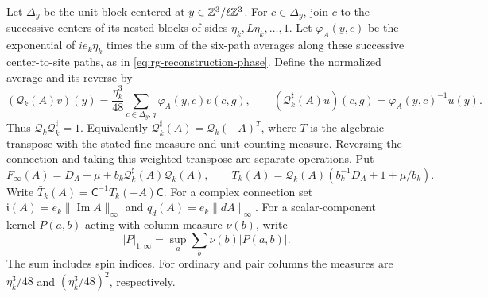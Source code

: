 Let \(\Delta_y\) be the unit block centered at
\(y\in\mathbb Z^3/\ell\mathbb Z^3\). For \(c\in\Delta_y\), join \(c\) to the
successive centers of its nested blocks of sides
\(\eta_k,L\eta_k,\ldots,1\). Let \(\varphi_A(y,c)\) be the
exponential of \(ie_k\eta_k\) times the sum of the six-path
averages along these successive center-to-site paths, as in
\eqref{eq:rg-reconstruction-phase}. Define the normalized average
and its reverse by
\begin{equation}\label{eq:reconstruction-average}
 (\mathcal Q_k(A)v)(y)
      =\frac{\eta_k^3}{48}\sum_{c\in\Delta_y,g}
                                     \varphi_A(y,c)v(c,g),\qquad
 (\mathcal Q_k^\sharp(A)u)(c,g)=\varphi_A(y,c)^{-1}u(y).
\end{equation}
Thus \(\mathcal Q_k\mathcal Q_k^\sharp=1\).
Equivalently \(\mathcal Q_k^\sharp(A)=\mathcal Q_k(-A)^T\),
where \(T\) is the algebraic transpose with the stated fine
measure and unit counting measure. Reversing the connection and
taking this weighted transpose are separate operations.
Put
\[
 F_\infty(A)=D_A+\mu+b_k\mathcal Q_k^\sharp(A)\mathcal Q_k(A),
 \qquad
 T_k(A)=\mathcal Q_k(A)(b_k^{-1}D_A+1+\mu/b_k).
\]
Write \(\bar T_k(A)=\mathsf C^{-1}T_k(-A)\mathsf C\).
For a complex connection set
\(\mathfrak i(A)=e_k\|\operatorname{Im}A\|_\infty\) and
\(q_d(A)=e_k\|dA\|_\infty\).
For a scalar-component kernel \(P(a,b)\) acting with column
measure \(\nu(b)\), write
\[
 |P|_{1,\infty}=\sup_a\sum_b\nu(b)|P(a,b)|.
\]
The sum includes spin indices. For ordinary and pair columns
the measures are \(\eta_k^3/48\) and \((\eta_k^3/48)^2\),
respectively.

